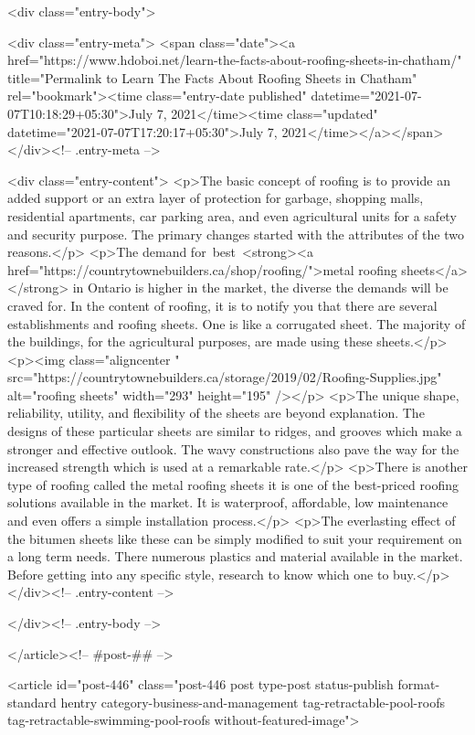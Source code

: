 	<div class="entry-body">

				<div class="entry-meta">
			<span class="date"><a href="https://www.hdoboi.net/learn-the-facts-about-roofing-sheets-in-chatham/" title="Permalink to Learn The Facts About Roofing Sheets in Chatham" rel="bookmark"><time class="entry-date published" datetime="2021-07-07T10:18:29+05:30">July 7, 2021</time><time class="updated" datetime="2021-07-07T17:20:17+05:30">July 7, 2021</time></a></span>		</div><!-- .entry-meta -->
		
				<div class="entry-content">
			<p>The basic concept of roofing is to provide an added support or an extra layer of protection for garbage, shopping malls, residential apartments, car parking area, and even agricultural units for a safety and security purpose. The primary changes started with the attributes of the two reasons.</p>
<p>The demand for best <strong><a href="https://countrytownebuilders.ca/shop/roofing/">metal roofing sheets</a></strong> in Ontario is higher in the market, the diverse the demands will be craved for. In the content of roofing, it is to notify you that there are several establishments and roofing sheets. One is like a corrugated sheet. The majority of the buildings, for the agricultural purposes, are made using these sheets.</p>
<p><img class="aligncenter " src="https://countrytownebuilders.ca/storage/2019/02/Roofing-Supplies.jpg" alt="roofing sheets" width="293" height="195" /></p>
<p>The unique shape, reliability, utility, and flexibility of the sheets are beyond explanation. The designs of these particular sheets are similar to ridges, and grooves which make a stronger and effective outlook. The wavy constructions also pave the way for the increased strength which is used at a remarkable rate.</p>
<p>There is another type of roofing called the metal roofing sheets it is one of the best-priced roofing solutions available in the market. It is waterproof, affordable, low maintenance and even offers a simple installation process.</p>
<p>The everlasting effect of the bitumen sheets like these can be simply modified to suit your requirement on a long term needs. There numerous plastics and material available in the market. Before getting into any specific style, research to know which one to buy.</p>
					</div><!-- .entry-content -->
		
		
			</div><!-- .entry-body -->

</article><!-- #post-## -->

			
				
<article id="post-446" class="post-446 post type-post status-publish format-standard hentry category-business-and-management tag-retractable-pool-roofs tag-retractable-swimming-pool-roofs without-featured-image">

